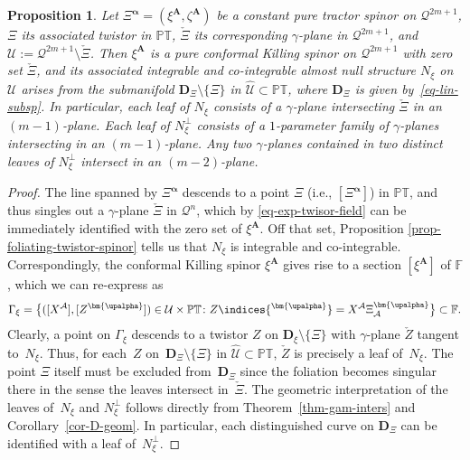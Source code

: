 \documentclass[pdftex]{sigma}
\numberwithin{equation}{section}
\newtheorem{Proposition}[Theorem]{Proposition}
 { \theoremstyle{definition}
\newtheorem{Definition}[Theorem]{Definition}
\newtheorem{Example}[Theorem]{Example}
\newtheorem{Remark}[Theorem]{Remark} }
\newcommand{\mbf} [1]{\mathbf{#1}}
\newcommand{\mc} [1]{\mathcal{#1}}
\newcommand{\ind} {\indices}
\newcommand{\PT} {\mathbb{PT}}
\newcommand{\F} {\mathbb{F}}
\begin{document}
\begin{Proposition}\label{prop-Robinson-congruence-odd}
 Let $\Xi^{\bm{\upalpha}}=(\xi^{\mbf{A}} , \zeta^{\mbf{A}})$ be a constant pure tractor spinor on $\mc{Q}^{2m+1}$, $\Xi$ its associated twistor in $\PT$, $\check{\Xi}$ its corresponding $\gamma$-plane in $\mc{Q}^{2m+1}$, and $\mc{U}:= \mc{Q}^{2m+1} \setminus \check{\Xi}$. Then $\xi^{\mbf{A}}$ is a pure conformal Killing spinor on $\mc{Q}^{2m+1}$ with zero set $\check{\Xi}$, and its associated integrable and co-integrable almost null structure $N_\xi$ on $\mc{U}$ arises from the submanifold $\mathbf{D}_\Xi \setminus \{ \Xi \}$ in $\widehat{\mc{U}} \subset \PT$, where $\mathbf{D}_\Xi$ is given by~\eqref{eq-lin-subsp}. In particular, each leaf of $N_\xi$ consists of a $\gamma$-plane intersecting $\check{\Xi}$ in an $(m-1)$-plane. Each leaf of $N_\xi^\perp$ consists of a $1$-parameter family of $\gamma$-planes intersecting in an $(m-1)$-plane. Any two $\gamma$-planes contained in two distinct leaves of $N_\xi^\perp$ intersect in an $(m-2)$-plane.
\end{Proposition}

\begin{proof}
The line spanned by $\Xi^{\bm{\upalpha}}$ descends to a point $\Xi$ (i.e., $[\Xi^{\bm{\upalpha}}]$) in $\PT$, and thus singles out a $\gamma$-plane $\check{\Xi}$ in $\mc{Q}^n$, which by \eqref{eq-exp-twisor-field} can be immediately identif\/ied with the zero set of $\xi^\mbf{A}$. Of\/f that set, Proposition \ref{prop-foliating-twistor-spinor} tells us that $N_\xi$ is integrable and co-integrable. Correspondingly, the conformal Killing spinor $\xi^{\mbf{A}}$ gives rise to a section $[\xi^{\mbf{A}}]$ of $\F$, which we can re-express as
\begin{gather*}
 \Gamma_{\xi} = \big\{ ([X^\mc{A}] , [Z^{\bm{\upalpha}}]) \in \mc{U} \times \PT \colon Z \ind{^{\bm{\upalpha}}} = X^\mc{A} \Xi _\mc{A} ^{\bm{\upalpha}} \big\} \subset \F .
\end{gather*}
Clearly, a point on $\Gamma_{\xi}$ descends to a twistor $Z$ on $\mathbf{D}_\xi \setminus \{ \Xi \}$ with $\gamma$-plane $\check{Z}$ tangent to~$N_\xi$. Thus, for each~$Z$ on~$\mathbf{D}_\Xi \setminus \{ \Xi \}$ in $\widehat{\mc{U}} \subset \PT$, $\check{Z}$ is precisely a leaf of~$N_\xi$. The point $\Xi$ itself must be excluded from~$\mathbf{D}_\Xi$ since the foliation becomes singular there in the sense the leaves intersect in~$\check{\Xi}$. The geometric interpretation of the leaves of~$N_\xi$ and $N_\xi^\perp$ follows directly from Theorem~\ref{thm-gam-inters} and Corollary~\ref{cor-D-geom}. In particular, each distinguished curve on $\mathbf{D}_\Xi$ can be identif\/ied with a leaf of~$N_\xi^\perp$.
\end{proof}
\end{document}
